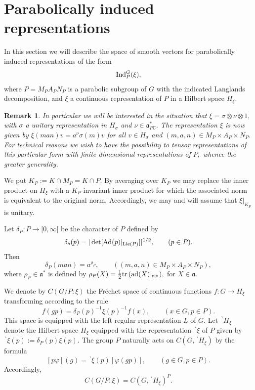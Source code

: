 \documentclass[12pt,a4paper]{article}
\newtheorem{Rem}[Thm]{Remark}
\newenvironment{rem}[0]{\begin{Rem}\noindent\rm}%
{\end{Rem}}
\def\qquad{\quad\quad}
\def\msy#1{{\mathbb #1}}
\def\C{{\msy C}}
\def\gd{\delta}
\def\gf{\varphi}
\def\gs{\sigma}
\def\got#1{\mathfrak #1}
\def\fa{{\got a}}
\def\fn{{\got n}}
\def\to{\rightarrow}
\def\Ad{{\rm Ad}}
\def\ad{{\rm ad}}
\def\tr{{\rm tr}\,}
\def\iC{{\scriptscriptstyle \C}}
\numberwithin{Thm}{section}
\numberwithin{equation}{section}
\def\Ind{{\rm Ind}}
\def\faPdc{{\fa_{P\iC}^*}}
\numberwithin{equation}{section}
\def\fad{{\fa^*}}
\def\bp{\!{\,}^\backprime}
\def\faPdc{\fa_{P\iC}^*}
\begin{document}
\section{Parabolically induced representations}
\label{s: par ind reps}
In this section we will describe the space of smooth vectors for  
parabolically induced representations of the form
\begin{equation}
\label{e: parabolically induced rep}
\Ind_{P}^G(\xi),
\end{equation}
where 
 $P = M_P A_P N_P$ is a parabolic subgroup of $G$ with the indicated Langlands decomposition, 
 and $\xi$ a continuous representation of $P$ in a Hilbert space $H_\xi.$ 
 
 \begin{rem}
 \label{r: special form xi}
 In particular we will be interested in the situation that
 $\xi = \gs \otimes \nu \otimes 1,$ with $\gs$ a unitary representation in $H_\gs$ 
 and $\nu \in \faPdc.$ 
 The representation $\xi$ is now given by $\xi(man)v = a^\nu \gs(m)v$ for all
 $v \in H_\gs$ and $(m,a,n) \in M_P \times A_P \times N_P.$  For technical 
 reasons we wish to have the possibility to tensor representations 
 of this particular form with finite dimensional representations of $P,$ whence the greater generality.
 \end{rem}
 
We put $K_P:= K\cap M_P = K \cap P.$ 
By averaging over $K_P$ we may replace the inner product on $H_\xi$ 
with a $K_P$-invariant inner product for which the associated norm is equivalent to  the original norm.
Accordingly, we may and will assume that $\xi|_{K_P}$ is unitary.

Let $\gd_P: P \to [0,\infty[$ be the character of  $P$ defined by 
$$ 
\gd_\gd(p) = |\det [\Ad(p)|_{{\rm Lie}(P)}]|^{1/2},\qquad (p\in P).
$$%
Then 
$$ 
\gd_P(man) = a^{\rho_P}, \qquad ((m,a,n) \in M_P \times A_P \times N_P),
$$%
where $\rho_P\in \fad$ is defined by $\rho_P(X) =\frac12 \tr (\ad (X)|_{\fn_P}),$ 
for $X \in \fa.$ 

We denote by  $C(G/P: \xi)$ the Fr\'echet space of continuous functions
$f: G \to H_\xi$ transforming according to the rule
$$ 
f(g p) =   \gd_P(p)^{-1} \xi(p)^{-1} f(x), \qquad (x \in G, p \in P).
$$%
This space is equipped with the left regular representation $L$ of $G.$ 
Let $\bp H_\xi$ denote the Hilbert space $H_\xi$ equipped with the 
representation $\bp \xi$ of $P$ given by 
$
\bp \xi(p) := \gd_P(p) \xi(p). 
$
The group  $P$ naturally acts on $C(G, \bp H_\xi)$ by the formula
\begin{equation}
\label{e: action of P on function space}
[p\gf] (g) = \bp\xi(p) [ \gf(gp)], \qquad (g \in G, p\in P).
\end{equation}
Accordingly, 
$$ 
C(G/P:\xi) = C(G, \bp H_\xi)^P.
$$%
\end{document}
